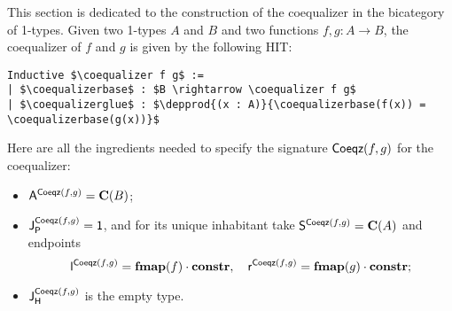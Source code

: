 This section is dedicated to the construction of the coequalizer in
the bicategory of 1-types.  Given two 1-types $A$ and $B$ and two
functions $f , g: A \to B$, the coequalizer of $f$ and $g$ is
given by the following HIT:
\begin{lstlisting}[mathescape=true]
Inductive $\coequalizer f g$ :=
| $\coequalizerbase$ : $B \rightarrow \coequalizer f g$
| $\coequalizerglue$ : $\depprod{(x : A)}{\coequalizerbase(f(x)) = \coequalizerbase(g(x))}$
\end{lstlisting}

Here are all the ingredients needed to specify the signature $\coequalizer f g$ for the coequalizer:
\begin{itemize}
\item $\pointconstr[\coequalizer f g] = \constantP{B}$;
\item $\pathlabel[\coequalizer f g] = \unit$, and for its unique inhabitant take $\patharg[\coequalizer f g] = \constantP{A}$ and endpoints
  \[
  \pathleft[\coequalizer f g] = \comp{\fmap(f)}{\constr}, \quad
  \pathright[\coequalizer f g] = \comp{\fmap(g)}{\constr}; 
  \]
\item $\homotlabel[\coequalizer f g]$ is the empty type.
\end{itemize}




